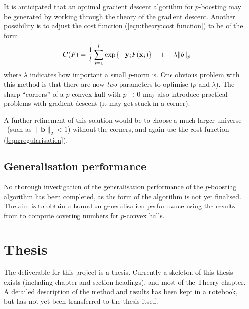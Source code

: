 It is anticipated that an optimal gradient descent algorithm for
$p$-boosting may be generated by working through the theory of the
gradient descent.  Another possibility is to adjust the cost function
(\ref{eqn:theory:cost function}) to be of the form
%
\begin{equation}
C(F) = \frac{1}{l} \sum_{i=1}^{l} \exp
\left\{ -\mathbf{y}_iF(\mathbf{x}_i) \right\} \quad + \quad \lambda \|b\|_p
\label{eqn:regularisation}
\end{equation}
%
where $\lambda$ indicates how important a small $p$-norm is.  One
obvious problem with this method is that there are now \emph{two}
parameters to optimise ($p$ and $\lambda$).  The sharp ``corners'' of a
$p$-convex hull with $p \rightarrow 0$ may also introduce practical
problems with gradient descent (it may get stuck in a corner).

A further refinement of this solution would be to choose a much larger
universe \calX\ (such as $\|\mathbf{b}\|_2 < 1$) without the corners,
and again use the cost function (\ref{eqn:regularisation}).


\subsection{Generalisation performance}
\label{sec:current:generalisation performance}

No thorough investigation of the generalisation performance of the
$p$-boosting algorithm has been completed, as the form of the
algorithm is not yet finalised.  The aim is to obtain a bound on
generalisation performance using the results from \cite{Williamson99}
to compute covering numbers for $p$-convex hulls.


\section{Thesis}

The deliverable for this project is a thesis.  Currently a skeleton of
this thesis exists (including chapter and section headings), and most
of the Theory chapter.  A detailed description of the method and
results has been kept in a notebook, but has not yet been transferred
to the thesis itself.
